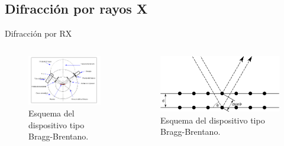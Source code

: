 \documentclass[11pt]{beamer}
\begin{document}
	\subsection{Difracción por rayos X}
		\begin{frame}{Difracción por RX}
			\begin{columns}
				\begin{column}{.49\textwidth}
					\begin{figure}[H]
						\centering
						\includegraphics[scale=0.4]{img/gonio.png}
						\caption*{Esquema del dispositivo tipo Bragg-Brentano.}
					\end{figure}
				\end{column}
				\begin{column}{.49\textwidth}
					\begin{figure}[H]
						\centering
						\includegraphics[scale=0.1]{img/Bragg.png}
						\caption*{Esquema del dispositivo tipo Bragg-Brentano.}
					\end{figure}
				\end{column}
			\end{columns}
		\end{frame}
	
\end{document}
